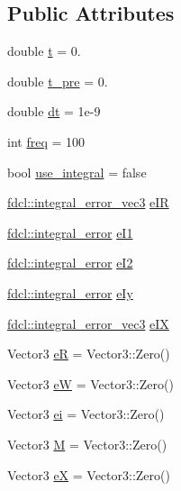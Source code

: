 \subsection*{Public Attributes}
\begin{DoxyCompactItemize}
\item 
double \hyperlink{classfdcl_1_1control_a85f288d9d87aeb6d6d5509235c4648d9}{t} = 0.
\item 
double \hyperlink{classfdcl_1_1control_ae8000fb9172118f05c69f9fb265b55ef}{t\+\_\+pre} = 0.
\item 
double \hyperlink{classfdcl_1_1control_ab88203b25382616db08db2f4a3cea481}{dt} = 1e-\/9
\item 
int \hyperlink{classfdcl_1_1control_addf63b932fa19bddee426be333843fcb}{freq} = 100
\item 
bool \hyperlink{classfdcl_1_1control_a02b30bdec43753deab3f657562a59065}{use\+\_\+integral} = false
\item 
\hyperlink{structfdcl_1_1integral__error__vec3}{fdcl\+::integral\+\_\+error\+\_\+vec3} \hyperlink{classfdcl_1_1control_ab59f7fd938d291ec387a820eb766a2a5}{e\+IR}
\item 
\hyperlink{structfdcl_1_1integral__error}{fdcl\+::integral\+\_\+error} \hyperlink{classfdcl_1_1control_aa8cc0bd5f3521e4c0460f086b0d81166}{e\+I1}
\item 
\hyperlink{structfdcl_1_1integral__error}{fdcl\+::integral\+\_\+error} \hyperlink{classfdcl_1_1control_aaae1fb8260741f98f50009d4205b940e}{e\+I2}
\item 
\hyperlink{structfdcl_1_1integral__error}{fdcl\+::integral\+\_\+error} \hyperlink{classfdcl_1_1control_a1d33b4d53f99c73983fdbe70ce506ce8}{e\+Iy}
\item 
\hyperlink{structfdcl_1_1integral__error__vec3}{fdcl\+::integral\+\_\+error\+\_\+vec3} \hyperlink{classfdcl_1_1control_a2d7453277a587c8c9b556505f3e3958c}{e\+IX}
\item 
Vector3 \hyperlink{classfdcl_1_1control_af3d563b76ffba90a299349b0968d2b1e}{eR} = Vector3\+::\+Zero()
\item 
Vector3 \hyperlink{classfdcl_1_1control_a3831084838463bafbf25ad50ce39df6d}{eW} = Vector3\+::\+Zero()
\item 
Vector3 \hyperlink{classfdcl_1_1control_a4a67e30ea06e07869210033406cf58cb}{ei} = Vector3\+::\+Zero()
\item 
Vector3 \hyperlink{classfdcl_1_1control_afdd2524a3a5bb05b7235fdca829be124}{M} = Vector3\+::\+Zero()
\item 
Vector3 \hyperlink{classfdcl_1_1control_ad32044f0b435db25f67e5c2f4a5d91d8}{eX} = Vector3\+::\+Zero()

\end{DoxyCompactItemize}
